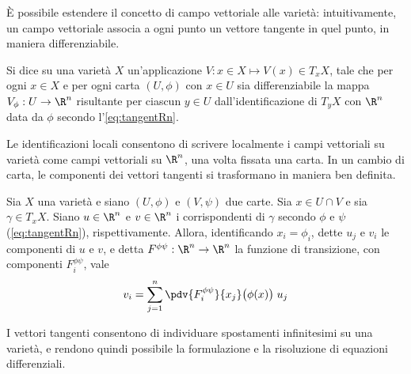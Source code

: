 È possibile estendere il concetto di campo vettoriale alle varietà: intuitivamente, un campo vettoriale associa a ogni punto un vettore tangente in quel punto, in maniera differenziabile.
\begin{definition} \label{def:vecField}
  Si dice  su una varietà $X$ un'applicazione $V: x \in  X \mapsto V (x) \in T_x X$, tale che per ogni $x \in X$ e per ogni carta $(U, \phi)$ con $x \in U$ sia differenziabile la mappa $V_\phi:U \to \R^{n}$ risultante per ciascun $y \in  U$ dall'identificazione di $T_y X$ con $\R^{n}$ data da $\phi$ secondo l'\autoref{eq:tangentRn}.
\end{definition}

Le identificazioni locali consentono di scrivere localmente i campi vettoriali su varietà come campi vettoriali su $\R^{n}$, una volta fissata una carta. In un cambio di carta, le componenti dei vettori tangenti si trasformano in maniera ben definita.
\begin{theorem} 
  Sia $X$ una varietà e siano $(U,\phi)$ e $(V,\psi)$ due carte. Sia $x \in  U \cap V$ e sia $\gamma \in  T_x X$. Siano $u \in \R^{n}$ e $v \in  \R^{n}$ i corrispondenti di $\gamma$ secondo $\phi$ e $\psi$ (\autoref{eq:tangentRn}), rispettivamente. Allora, identificando $x_i = \phi_i$, dette $u_j$ e $v_i$ le componenti di $u$ e $v$, e detta $F^{\phi\psi}:\R^{n} \to \R^{n}$ la funzione di transizione, con componenti $F^{\phi \psi}_i$, vale \begin{equation} \label{eq:vecTrans}
  v_i = \sum_{j=1}^n \pdv{F^{\phi \psi}_i}{x_j}\big(\phi(x)\big)\; u_j
  \end{equation} 
\end{theorem}

I vettori tangenti consentono di individuare spostamenti infinitesimi su una varietà, e rendono quindi possibile la formulazione e la risoluzione di equazioni differenziali.

